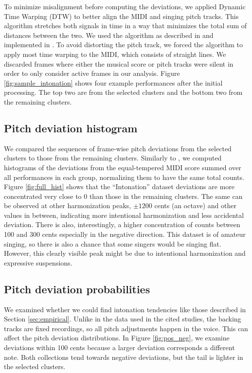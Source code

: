 To minimize misalignment before computing the deviations, we applied Dynamic Time Warping (DTW) \cite{berndt1994using} to better align the MIDI and singing pitch tracks. This algorithm stretches both signals in time in a way that minimizes the total sum of distances between the two. We used the algorithm as described in \cite{muller2015fundamentals} and implemented in \cite{mcfee2015librosa}. To avoid distorting the pitch track, we forced the algorithm to apply most time warping to the MIDI, which consists of straight lines. We discarded frames where either the musical score or pitch tracks were silent in order to only consider active frames in our analysis. Figure \ref{fig:sample_intonation} shows four example performances after the initial processing. The top two are from the selected clusters and the bottom two from the remaining clusters.

\subsection{Pitch deviation histogram}
We compared the sequences of frame-wise pitch deviations from the selected clusters to those from the remaining clusters. Similarly to \cite{nichols2012automatically}, we computed histograms of the deviations from the equal-tempered MIDI score summed over all performances in each group, normalizing them to have the same total counts. Figure \ref{fig:full_hist} shows that the ``Intonation'' dataset deviations are more concentrated very close to 0 than those in the remaining clusters. The same can be observed at other harmonization peaks, $\pm1200$ cents (an octave) and other values in between, indicating more intentional harmonization and less accidental deviation. There is also, interestingly, a higher concentration of counts between 100 and 300 cents especially in the negative direction. This dataset is of amateur singing, so there is also a chance that some singers would be singing flat. However, this clearly visible peak might be due to intentional harmonization and expressive suspensions. 

\subsection{Pitch deviation probabilities}
We examined whether we could find intonation tendencies like those described in Section \ref{sec:empirical}. Unlike in the data used in the cited studies, the backing tracks are fixed recordings, so all pitch adjustments happen in the voice. This can affect the pitch deviation distributions. In Figure \ref{fig:pos_neg}, we examine deviations within 100 cents because a larger deviation corresponds a different note. Both collections tend towards negative deviations, but the tail is lighter in the selected clusters.

